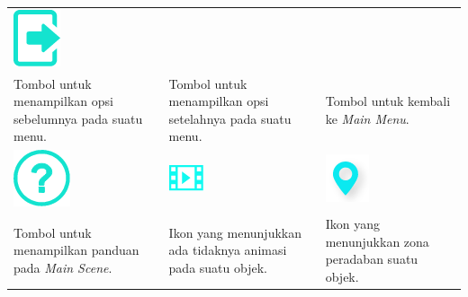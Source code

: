 \begin{table}[h]
\begin{tabular}{|C{3 cm}|C{3 cm}|C{3 cm}|}
				\includegraphics[width=0.2\linewidth]{img/bab3/button/mm_sblm.png} \\ 
				Tombol untuk menampilkan opsi sebelumnya pada suatu menu.\label{fig:ikon_prev}&
				Tombol untuk menampilkan opsi setelahnya pada suatu menu.\label{fig:ikon_next}& 
				Tombol untuk kembali ke \textit{Main Menu}.\label{fig:tb_mainmenu}\\ \hline
				\includegraphics[width=0.2\linewidth]{img/bab3/button/help_sblm.png}&
				\includegraphics[width=0.2\linewidth]{img/bab3/button/animated.png}&
				\includegraphics[width=0.2\linewidth]{img/bab3/button/zona.png} \\ 
				Tombol untuk menampilkan panduan pada \textit{Main Scene}.\label{fig:tb_help}&
				Ikon yang menunjukkan ada tidaknya animasi pada suatu objek.\label{fig:ikon_animasi}& 
				Ikon yang menunjukkan zona peradaban suatu objek.\\ \hline
			\end{tabular}	
		\end{table}
		\vspace{-2ex}
		
